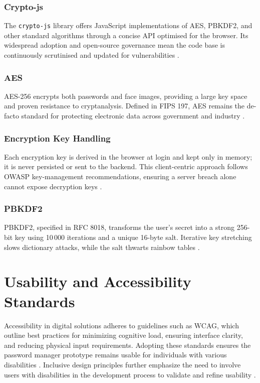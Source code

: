 \subsubsection{Crypto-js}  
The \texttt{crypto-js} library offers JavaScript implementations of AES,
PBKDF2, and other standard algorithms through a concise API optimised for the
browser.  Its widespread adoption and open-source governance mean the code
base is continuously scrutinised and updated for vulnerabilities
\autocite{CryptoJS2024}.

\subsubsection{AES}  
AES-256 encrypts both passwords and face images, providing a large key space
and proven resistance to cryptanalysis.  Defined in FIPS 197, AES remains the
de-facto standard for protecting electronic data across government and
industry \autocite{NISTFIPS197}. 

\subsubsection{Encryption Key Handling}  
Each encryption key is derived in the browser at login and kept only in
memory; it is never persisted or sent to the backend.  This client-centric
approach follows OWASP key-management recommendations, ensuring a server
breach alone cannot expose decryption keys
\autocite{OWASPKeyMgmt2025}. 

\subsubsection{PBKDF2}  
PBKDF2, specified in RFC 8018, transforms the user's secret into a strong
256-bit key using 10\,000 iterations and a unique 16-byte salt.  Iterative
key stretching slows dictionary attacks, while the salt thwarts rainbow
tables \autocite{RFC8018}.

\section{Usability and Accessibility Standards}
Accessibility in digital solutions adheres to guidelines such as WCAG, which outline best practices for minimizing cognitive load, ensuring interface clarity, and reducing physical input requirements. Adopting these standards ensures the password manager prototype remains usable for individuals with various disabilities \autocite{Brewer2023}. Inclusive design principles further emphasize the need to involve users with disabilities in the development process to validate and refine usability \autocite{Lazar2015}.

